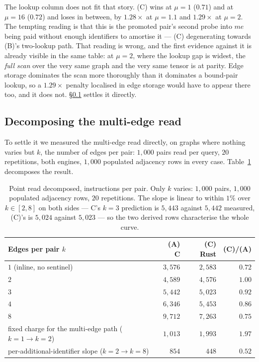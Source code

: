 \documentclass[11pt,a4paper]{article}
\theoremstyle{plain}
\theoremstyle{definition}
\theoremstyle{remark}
\begin{document}
The lookup column does not fit that story. (C) wins at $\mu = 1$ ($0.71$) and
at $\mu = 16$ ($0.72$) and loses in between, by $1.28\times$ at $\mu = 1.1$ and
$1.29\times$ at $\mu = 2$. The tempting reading is that this is the promoted
pair's second probe into $me$ being paid without enough identifiers to amortise
it --- (C) degenerating towards (B)'s two-lookup path. That reading is wrong,
and the first evidence against it is already visible in the same table: at
$\mu = 2$, where the lookup gap is widest, the \emph{full scan} over the very
same graph and the very same tensor is at parity. Edge storage dominates the
scan more thoroughly than it dominates a bound-pair lookup, so a $1.29\times$
penalty localised in edge storage would have to appear there too, and it does
not. \S\ref{sec:evaldecomp} settles it directly.

\subsection{Decomposing the multi-edge read}
\label{sec:evaldecomp}

To settle it we measured the multi-edge read directly, on graphs where nothing
varies but $k$, the number of edges per pair: $1{,}000$ pairs read per query,
$20$ repetitions, both engines, $1{,}000$ populated adjacency rows in every
case. Table~\ref{tab:evaldecomp} decomposes the result.

\begin{table}[!ht]
\centering
\small
\begin{tabular}{@{}lrrr@{}}
\toprule
Edges per pair $k$ & (A) C & (C) Rust & (C)/(A) \\
\midrule
$1$ (inline, no sentinel) & $3{,}576$ & $2{,}583$ & $0.72$ \\
$2$                       & $4{,}589$ & $4{,}576$ & $1.00$ \\
$3$                       & $5{,}442$ & $5{,}023$ & $0.92$ \\
$4$                       & $6{,}346$ & $5{,}453$ & $0.86$ \\
$8$                       & $9{,}712$ & $7{,}263$ & $0.75$ \\
\midrule
fixed charge for the multi-edge path ($k{=}1 \to k{=}2$) & $1{,}013$ & $1{,}993$ & $1.97$ \\
per-additional-identifier slope ($k{=}2 \to k{=}8$)      & $854$     & $448$     & $0.52$ \\
\bottomrule
\end{tabular}
\caption{Point read decomposed, instructions per pair. Only $k$ varies:
$1{,}000$ pairs, $1{,}000$ populated adjacency rows, $20$ repetitions. The
slope is linear to within $1\%$ over $k \in [2,8]$ on both sides --- C's
$k{=}3$ prediction is $5{,}443$ against $5{,}442$ measured, (C)'s is $5{,}024$
against $5{,}023$ --- so the two derived rows characterise the whole curve.}
\label{tab:evaldecomp}
\end{table}
\end{document}
